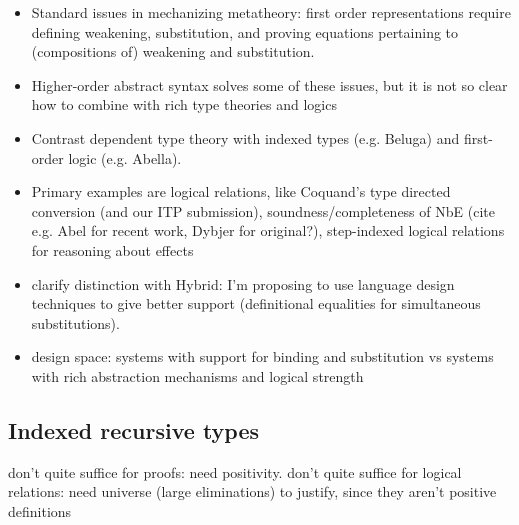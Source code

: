\documentclass{article}
\begin{document}
\begin{itemize}
\item Standard issues in mechanizing metatheory: first order
  representations require defining weakening, substitution, and proving
  equations pertaining to (compositions of) weakening and
  substitution.
\item Higher-order abstract syntax solves some of these issues, but it
  is not so clear how to combine with rich type theories and logics
\item Contrast dependent type theory with indexed types (e.g. Beluga) and first-order
logic (e.g. Abella). 

\item Primary examples are logical relations, like Coquand's type
directed conversion (and our ITP submission), soundness/completeness of NbE
(cite e.g. Abel for recent work, Dybjer for original?),
step-indexed logical relations for reasoning about effects

\item clarify distinction with Hybrid: I'm proposing to use language design
techniques to give better support (definitional equalities for
simultaneous substitutions).

\item design space: systems with support for binding and substitution vs
systems with rich abstraction mechanisms and logical strength





\end{itemize}

\subsection{Indexed recursive types}

don't quite suffice for proofs: need positivity. don't quite suffice
for logical relations: need universe (large eliminations) to justify,
since they aren't positive definitions
\end{document}
